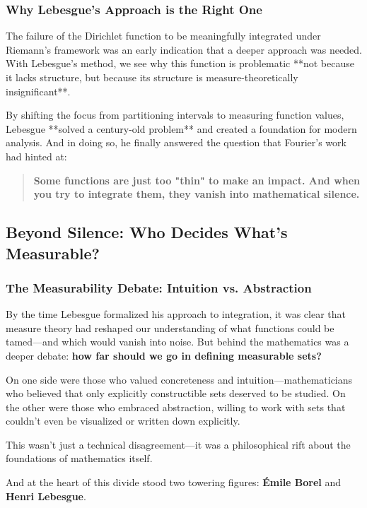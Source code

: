 \subsubsection{Why Lebesgue’s Approach is the Right One}

The failure of the Dirichlet function to be meaningfully integrated under Riemann’s framework was an early indication that a deeper approach was needed. With Lebesgue’s method, we see why this function is problematic **not because it lacks structure, but because its structure is measure-theoretically insignificant**.

By shifting the focus from partitioning intervals to measuring function values, Lebesgue **solved a century-old problem** and created a foundation for modern analysis. And in doing so, he finally answered the question that Fourier's work had hinted at:

\begin{quote}
\textbf{Some functions are just too "thin" to make an impact. And when you try to integrate them, they vanish into mathematical silence.}
\end{quote}


\subsection{Beyond Silence: Who Decides What’s Measurable?}

\subsubsection{The Measurability Debate: Intuition vs. Abstraction}

By the time Lebesgue formalized his approach to integration, it was clear that measure theory had reshaped our understanding of what functions could be tamed—and which would vanish into noise. But behind the mathematics was a deeper debate: \textbf{how far should we go in defining measurable sets?}

On one side were those who valued concreteness and intuition—mathematicians who believed that only explicitly constructible sets deserved to be studied. On the other were those who embraced abstraction, willing to work with sets that couldn’t even be visualized or written down explicitly.

This wasn’t just a technical disagreement—it was a philosophical rift about the foundations of mathematics itself.

And at the heart of this divide stood two towering figures: \textbf{Émile Borel} and \textbf{Henri Lebesgue}.

